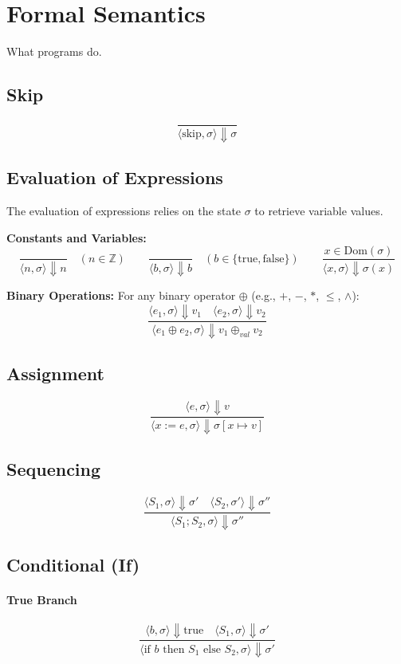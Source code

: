 \documentclass{article}
\begin{document}
	\section{Formal Semantics}
	What programs do.
	
	\subsection{Skip}
	\[
	\dfrac{}{\langle \text{skip}, \sigma \rangle \Downarrow \sigma}
	\]
	
	\subsection{Evaluation of Expressions}
	The evaluation of expressions relies on the state $\sigma$ to retrieve variable values.
	
	\textbf{Constants and Variables:}
	\[
	\frac{}{\langle n, \sigma \rangle \Downarrow n} \quad (n \in \mathbb{Z})
	\qquad
	\frac{}{\langle b, \sigma \rangle \Downarrow b} \quad (b \in \{\text{true}, \text{false}\})
	\qquad
	\frac{x \in \text{Dom}(\sigma)}{\langle x, \sigma \rangle \Downarrow \sigma(x)}
	\]
	
	\textbf{Binary Operations:}
	For any binary operator $\oplus$ (e.g., $+$, $-$, $*$, $\le$, $\wedge$):
	\[
	\frac{\langle e_1, \sigma \rangle \Downarrow v_1 \quad \langle e_2, \sigma \rangle \Downarrow v_2}{\langle e_1 \oplus e_2, \sigma \rangle \Downarrow v_1 \oplus_{val} v_2}
	\]
	
	\subsection{Assignment}
	\[
	\frac{\langle e, \sigma \rangle \Downarrow v}
	{\langle x := e, \sigma \rangle \Downarrow \sigma[x \mapsto v]}
	\]
	
	\subsection{Sequencing}
	\[
	\frac{\langle S_1, \sigma \rangle \Downarrow \sigma' \quad \langle S_2, \sigma' \rangle \Downarrow \sigma''}
	{\langle S_1 ; S_2, \sigma \rangle \Downarrow \sigma''}
	\]
	
	\subsection{Conditional (If)}
	\paragraph{True Branch}
	\[
	\frac{\langle b, \sigma \rangle \Downarrow \text{true} \quad \langle S_1, \sigma \rangle \Downarrow \sigma'}{\langle \text{if } b \text{ then } S_1 \text{ else } S_2, \sigma \rangle \Downarrow \sigma'}
	\]
	
\end{document}
